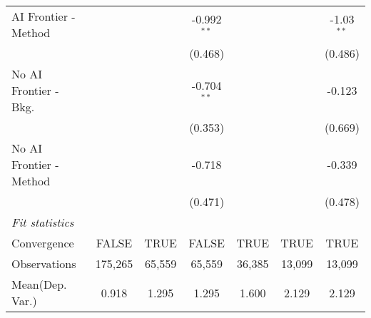\begin{tabular}{lcccccc}
   AI Frontier - Method    &                &              & -0.992$^{**}$ &               &               & -1.03$^{**}$\\   
                           &                &              & (0.468)       &               &               & (0.486)\\   
   No AI Frontier - Bkg.   &                &              & -0.704$^{**}$ &               &               & -0.123\\   
                           &                &              & (0.353)       &               &               & (0.669)\\   
   No AI Frontier - Method &                &              & -0.718        &               &               & -0.339\\   
                           &                &              & (0.471)       &               &               & (0.478)\\   
   \midrule
   \emph{Fit statistics}\\
   Convergence             &FALSE           & TRUE         & FALSE         & TRUE          & TRUE          & TRUE\\  
   Observations            & 175,265        & 65,559       & 65,559        & 36,385        & 13,099        & 13,099\\  
Mean(Dep. Var.) & 0.918 & 1.295 & 1.295 & 1.600 & 2.129 & 2.129 \\
   

\end{tabular}
